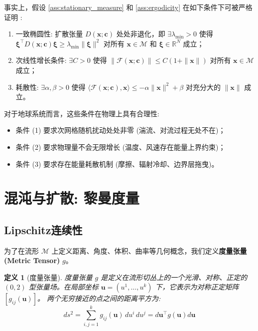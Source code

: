 \documentclass[12pt, a4paper]{article}
\newtheorem{definition}{定义}[section]
\newcommand{\R}{\mathbb{R}}
\newcommand{\manifold}{\mathcal{M}}
\newcommand{\metric}{g}
\newcommand{\fastvar}{\bm{x}}          %
\newcommand{\slowvar}{\bm{c}}          %
\newcommand{\drift}{\mathcal{F}}  %
\newcommand{\difftensor}{D}       %
\newcommand{\eigenval}{\lambda}         %
\begin{document}
事实上，假设 \ref{ass:stationary_measure} 和 \ref{ass:ergodicity} 在如下条件下可被严格证明 \cite{hairer2006ergodic}:
\begin{enumerate}
    \item 一致椭圆性: 扩散张量 $\difftensor(\fastvar; \slowvar)$ 处处非退化，即 $\exists \eigenval_{\min} > 0$ 使得 $\bm{\xi}^\top \difftensor(\fastvar; \slowvar) \bm{\xi} \geq \eigenval_{\min} \|\bm{\xi}\|^2$ 对所有 $\fastvar \in \manifold$ 和 $\bm{\xi} \in \R^N$ 成立；
    \item 次线性增长条件: $\exists C > 0$ 使得 $\|\drift(\fastvar; \slowvar)\| \leq C(1 + \|\fastvar\|)$ 对所有 $\fastvar \in \manifold$ 成立；
    \item 耗散性: $\exists \alpha, \beta > 0$ 使得 $\langle \drift(\fastvar; \slowvar), \fastvar \rangle \leq -\alpha \|\fastvar\|^2 + \beta$ 对充分大的 $\|\fastvar\|$ 成立。
\end{enumerate}

对于地球系统而言，这些条件在物理上具有合理性:
\begin{itemize}
    \item 条件 (1) 要求次网格随机扰动处处非零 (湍流、对流过程无处不在)；
    \item 条件 (2) 要求物理量不会无限增长 (温度、风速存在能量上界约束)；
    \item 条件 (3) 要求存在能量耗散机制 (摩擦、辐射冷却、边界层拖曳)。
\end{itemize}



\section{混沌与扩散: 黎曼度量}

\subsection{Lipschitz连续性}

为了在流形 $\manifold$ 上定义距离、角度、体积、曲率等几何概念，我们定义\textbf{度量张量 (Metric Tensor)} $\metric$。

\begin{definition}[度量张量]
\label{def:metric_tensor}
    度量张量 $g$ 是定义在流形切丛上的一个光滑、对称、正定的 $(0, 2)$ 型张量场。在局部坐标 $\bm{u} = (u^1, \ldots, u^k)$ 下，它表示为对称正定矩阵 $[\metric_{ij}(\bm{u})]$。
    两个无穷接近的点之间的距离平方为:
    \begin{equation}
    \label{eq:metric_tensor_def}
        ds^2 = \sum_{i,j=1}^k g_{ij}(\bm{u})\,du^i\,du^j = d\bm{u}^\top \metric(\bm{u}) d\bm{u}
    \end{equation}
\end{definition}
\end{document}
